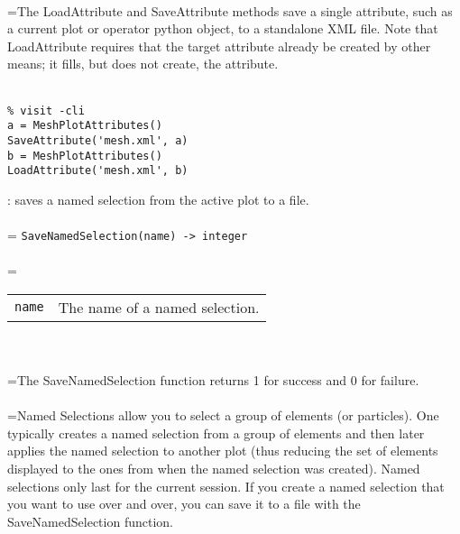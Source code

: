 \documentclass[10pt,a4paper]{report}
\begin{document}
 \\ 
\hangindent=\parindent The LoadAttribute and SaveAttribute methods save a single attribute, such as a current plot or operator python object, to a standalone XML file.  Note that LoadAttribute requires that the target attribute already be created by other means; it fills, but does not create, the attribute. \\[-3mm] 

\\[-6mm]
\begin{verbatim}% visit -cli
a = MeshPlotAttributes()
SaveAttribute('mesh.xml', a)
b = MeshPlotAttributes()
LoadAttribute('mesh.xml', b)
\end{verbatim}
\newpage


{}
: saves a named selection from the active plot to a file.\\[-3mm]

 \\ 
\hangindent=\parindent 
\verb!SaveNamedSelection(name) -> integer!\\ [-3mm]

 \\ 
\hangindent=\parindent 
\begin{tabular}{ll}
\verb!name! & The name of a named selection. \\
\end{tabular} \\[-2mm]


 \\ 
\hangindent=\parindent The SaveNamedSelection function returns 1 for success and 0 for failure. \\[-3mm] 

 \\ 
\hangindent=\parindent Named Selections allow you to select a group of elements (or particles). One typically creates a named selection from a group of elements and then later applies the named selection to another plot (thus reducing the set of elements displayed to the ones from when the named selection was created).  Named selections only last for the current session.  If you  create a named selection that you want to use over and over, you can save it to a file with the SaveNamedSelection function. \\[-3mm] 
\end{document}

